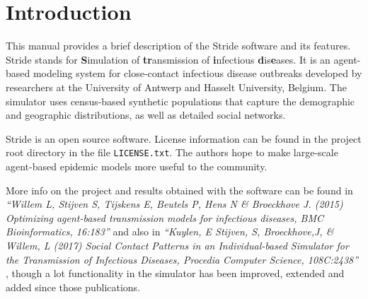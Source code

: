 \chapter{Introduction}
\label{chap:Introduction}
  
This manual provides a brief description of the Stride software and its
features. 
Stride stands for \textbf{S}imulation of \textbf{tr}ansmission 
 of \textbf{i}nfectious \textbf{d}is\textbf{e}ases. It is an agent-based modeling 
system for close-contact infectious disease outbreaks developed by researchers at the
University of Antwerp and Hasselt University, Belgium.
The simulator uses census-based synthetic populations
that capture the demographic and geographic distributions, as well as detailed social networks.

Stride is an open source software. License information can be found in the project root directory in the file \texttt{LICENSE.txt}. The authors hope to make large-scale
agent-based epidemic models more useful to the community.

More info on the project and results obtained with the software
can be found in
\textit{``Willem L, Stijven S, Tijskens E, Beutels P, Hens N \& Broeckhove J. (2015) Optimizing agent-based transmission models for infectious diseases, BMC Bioinformatics, 16:183''} \cite{willem2015} and also in \textit{``Kuylen, E Stijven, S, Broeckhove,J, \& Willem, L (2017) Social Contact Patterns in an Individual-based Simulator for the Transmission of Infectious Diseases, Procedia Computer Science, 108C:2438''} \cite{kuylen2017}, though a lot functionality in the simulator has been improved, extended and added since those publications.




